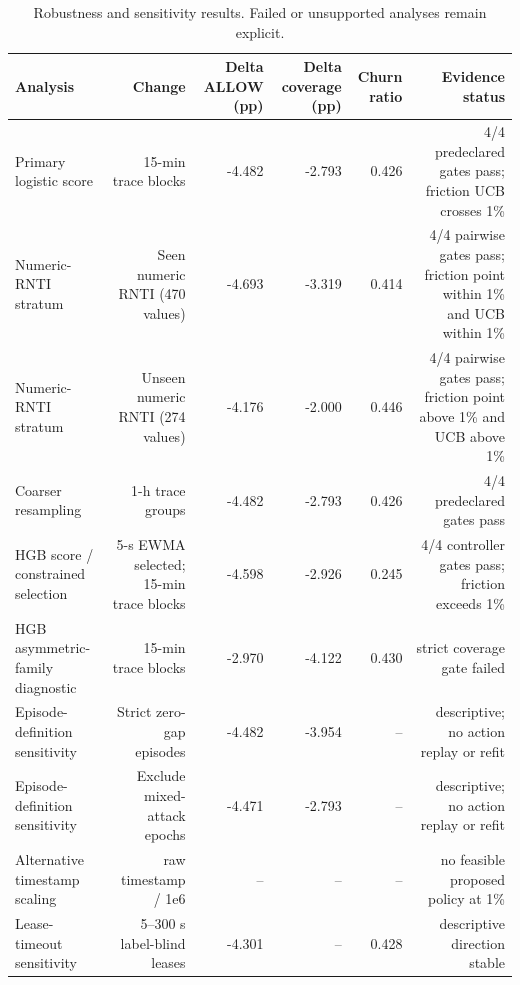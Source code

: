 \begin{table}[t]
\centering
\scriptsize
\caption{Robustness and sensitivity results. Failed or unsupported analyses remain explicit.}
\label{tab:robustness}
\begin{tabular}{lrrrrr}
\hline
Analysis & Change & Delta ALLOW (pp) & Delta coverage (pp) & Churn ratio & Evidence status \\
\hline
Primary logistic score & 15-min trace blocks & -4.482 & -2.793 & 0.426 & 4/4 predeclared gates pass; friction UCB crosses 1\% \\
Numeric-RNTI stratum & Seen numeric RNTI (470 values) & -4.693 & -3.319 & 0.414 & 4/4 pairwise gates pass; friction point within 1\% and UCB within 1\% \\
Numeric-RNTI stratum & Unseen numeric RNTI (274 values) & -4.176 & -2.000 & 0.446 & 4/4 pairwise gates pass; friction point above 1\% and UCB above 1\% \\
Coarser resampling & 1-h trace groups & -4.482 & -2.793 & 0.426 & 4/4 predeclared gates pass \\
HGB score / constrained selection & 5-s EWMA selected; 15-min trace blocks & -4.598 & -2.926 & 0.245 & 4/4 controller gates pass; friction exceeds 1\% \\
HGB asymmetric-family diagnostic & 15-min trace blocks & -2.970 & -4.122 & 0.430 & strict coverage gate failed \\
Episode-definition sensitivity & Strict zero-gap episodes & -4.482 & -3.954 & -- & descriptive; no action replay or refit \\
Episode-definition sensitivity & Exclude mixed-attack epochs & -4.471 & -2.793 & -- & descriptive; no action replay or refit \\
Alternative timestamp scaling & raw timestamp / 1e6 & -- & -- & -- & no feasible proposed policy at 1\% \\
Lease-timeout sensitivity & 5--300 s label-blind leases & -4.301 & -- & 0.428 & descriptive direction stable \\
\hline
\end{tabular}
\end{table}
